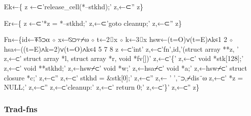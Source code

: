 \documentclass{article}%
\begin{document}
\nwenddocs{}\plusendmoddef\nwstartdeflinemarkup{}\nwenddeflinemarkup
Ek←\{
        z ←⊂'release_cell(*--stkhd);'
        z,←⊂''
z\}
\nwendcode{}\nwdocspar

\nwenddocs{}\plusendmoddef\nwstartdeflinemarkup{}\nwenddeflinemarkup
Er←\{
        z ←⊂'*z = *--stkhd;'
        z,←⊂'goto cleanup;'
        z,←⊂''
z\}
\nwendcode{}\nwdocspar

\nwenddocs{}\plusendmoddef\nwstartdeflinemarkup{}\nwenddeflinemarkup
Fn←\{id←⍕5⊃⍺ ⋄ x←⍉⊃⍪⌿⍵ ⋄ t←2⌷x ⋄ k←3⌷x
        hsw←(t=O)∨(t=E)∧k∊1 2 ⋄ hsa←((t=E)∧k=2)∨(t=O)∧k∊4 5 7 8
        z ←⊂'int'
        z,←⊂'fn',id,'(struct array **z, '
        z,←⊂'    struct array *l, struct array *r, void *fv[])'
        z,←⊂'\{'
        z,←⊂'       void    *stk[128];'
        z,←⊂'       void    **stkhd;'
        z,←hsw⌿⊂' void    *w;'
        z,←hsa⌿⊂' void    *a;'
        z,←hsw⌿⊂' struct  closure *c;'
        z,←⊂''
        z,←⊂'       stkhd = &stk[0];'
        z,←⊂''
        z,← ' ',¨⊃,⌿dis¨⍵
        z,←⊂'       *z = NULL;'
        z,←⊂''
        z,←⊂'cleanup:'
        z,←⊂'       return 0;'
        z,←⊂'\}'
        z,←⊂''
z\}
\nwendcode{}\nwdocspar

\subsubsection{Trad-fns}
\end{document}
